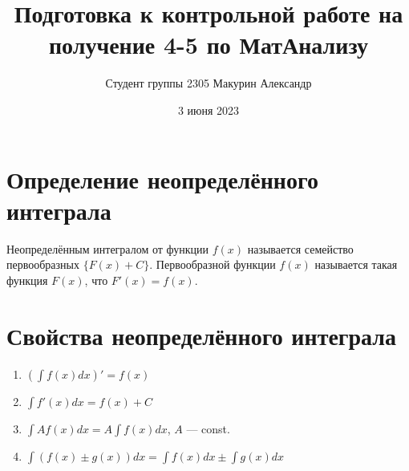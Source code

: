\documentclass[12pt]{article}
\title{Подготовка к контрольной работе на получение 4-5 по МатАнализу}
\author{Студент группы 2305 Макурин Александр}
\date{3 июня 2023}
\begin{document}
\maketitle

\section{Определение неопределённого интеграла}
Неопределённым интегралом от функции $f(x)$ называется семейство первообразных $\{F(x) + C\}$. Первообразной функции $f(x)$ называется такая функция $F(x)$, что $F'(x) = f(x)$.

\section{Свойства неопределённого интеграла}
\begin{enumerate}
    \item $(\int{f(x)dx})' = f(x)$
    \item $\int{f'(x)dx} = f(x) + C$
    \item $\int Af(x)dx = A\int f(x)dx$, $A$ — const.
    \item $\int (f(x) \pm g(x))dx = \int f(x)dx \pm \int g(x)dx$
\end{enumerate}
\end{document}
